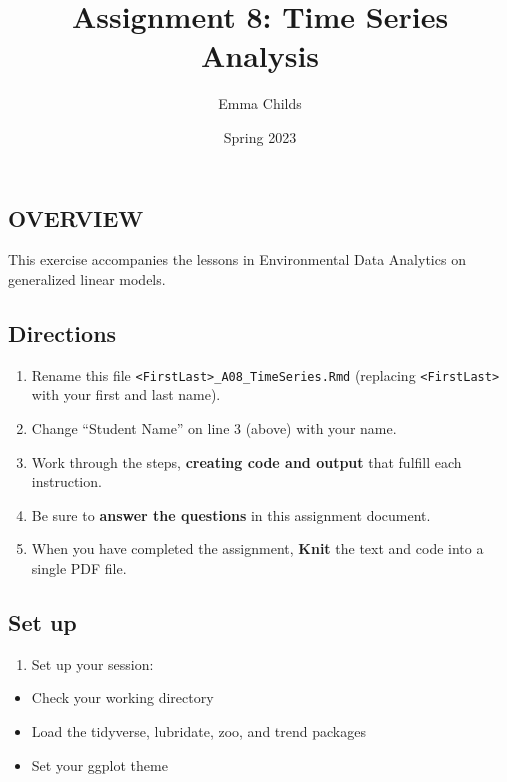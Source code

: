 \documentclass[
]{article}
\title{Assignment 8: Time Series Analysis}
\author{Emma Childs}
\date{Spring 2023}
\providecommand{\tightlist}{%
  \setlength{\itemsep}{0pt}\setlength{\parskip}{0pt}}
\begin{document}
\maketitle

\hypertarget{overview}{%
\subsection{OVERVIEW}\label{overview}}

This exercise accompanies the lessons in Environmental Data Analytics on
generalized linear models.

\hypertarget{directions}{%
\subsection{Directions}\label{directions}}

\begin{enumerate}
\def\labelenumi{\arabic{enumi}.}
\tightlist
\item
  Rename this file
  \texttt{\textless{}FirstLast\textgreater{}\_A08\_TimeSeries.Rmd}
  (replacing \texttt{\textless{}FirstLast\textgreater{}} with your first
  and last name).
\item
  Change ``Student Name'' on line 3 (above) with your name.
\item
  Work through the steps, \textbf{creating code and output} that fulfill
  each instruction.
\item
  Be sure to \textbf{answer the questions} in this assignment document.
\item
  When you have completed the assignment, \textbf{Knit} the text and
  code into a single PDF file.
\end{enumerate}

\hypertarget{set-up}{%
\subsection{Set up}\label{set-up}}

\begin{enumerate}
\def\labelenumi{\arabic{enumi}.}
\tightlist
\item
  Set up your session:
\end{enumerate}

\begin{itemize}
\tightlist
\item
  Check your working directory
\item
  Load the tidyverse, lubridate, zoo, and trend packages
\item
  Set your ggplot theme
\end{itemize}
\end{document}
